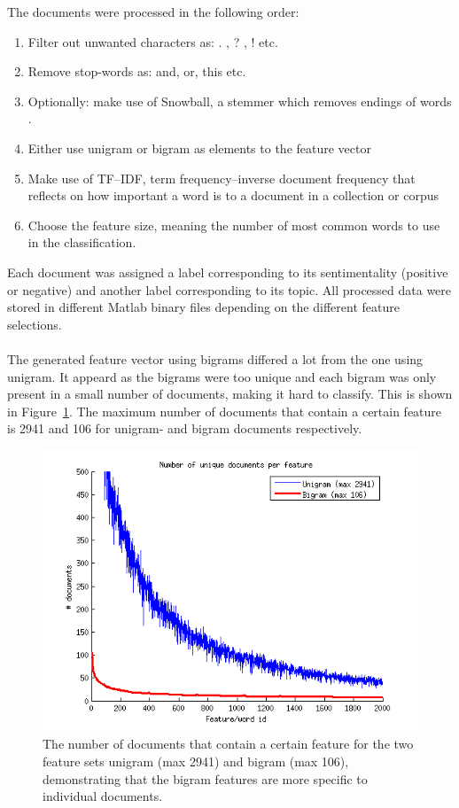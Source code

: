 The documents were processed in the following order:
\begin{enumerate}
\item Filter out unwanted characters as: . , ? , ! etc.
\item Remove stop-words as: and, or, this etc.
\item Optionally: make use of Snowball, a stemmer which removes endings of
words \citep{snowball_url}.
\item Either use unigram or bigram as elements to the feature vector
\item Make use of TF–IDF, term frequency–inverse document frequency that
reflects on how important a word is to a document in a collection or corpus
\item Choose the feature size, meaning the number of most common words to use
 in the classification.
\end{enumerate}
Each document was assigned a label corresponding to its sentimentality
(positive or negative) and another label corresponding to its topic.
All processed data were stored in different Matlab binary files depending on the
different feature selections.
\\\\
The generated feature vector using bigrams differed a lot from the one using
unigram. It appeard as the bigrams were too unique and each bigram was only
present in a small number of documents, making it hard to classify.  This is
shown in Figure~\ref{fig:docperfeature}. The maximum number of documents that contain a certain feature is 2941 and 106 for unigram- and bigram documents respectively.
\begin{figure}[h!]
\centering
\includegraphics[scale = 0.6]{../Plottar/documents_per_feature.png}
\caption{The number of documents that contain a certain feature for the two feature sets unigram (max 2941) and bigram (max 106), demonstrating that the bigram features are more specific to individual documents.}
\label{fig:docperfeature}
\end{figure}

